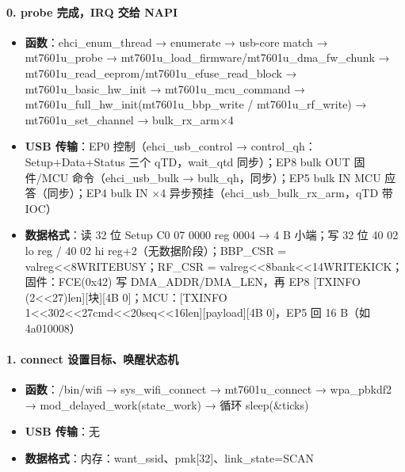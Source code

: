 \paragraph*{0. probe 完成，IRQ 交给 NAPI}
\begin{itemize}[leftmargin=2em,itemsep=1pt]
\item \textbf{函数}：ehci\_enum\_thread → enumerate → usb-core match → mt7601u\_probe → mt7601u\_load\_firmware/mt7601u\_dma\_fw\_chunk → mt7601u\_read\_eeprom/mt7601u\_efuse\_read\_block → mt7601u\_basic\_hw\_init → mt7601u\_mcu\_command → mt7601u\_full\_hw\_init(mt7601u\_bbp\_write / mt7601u\_rf\_write) → mt7601u\_set\_channel → bulk\_rx\_arm×4
\item \textbf{USB 传输}：EP0 控制（ehci\_usb\_control → control\_qh：Setup+Data+Status 三个 qTD，wait\_qtd 同步）；EP8 bulk OUT 固件/MCU 命令（ehci\_usb\_bulk → bulk\_qh，同步）；EP5 bulk IN MCU 应答（同步）；EP4 bulk IN ×4 异步预挂（ehci\_usb\_bulk\_rx\_arm，qTD 带 IOC）
\item \textbf{数据格式}：读 32 位 Setup C0 07 0000 reg 0004 → 4 B 小端；写 32 位 40 02 lo reg / 40 02 hi reg+2（无数据阶段）；BBP\_CSR = val\textbar{}reg\textless{}\textless{}8\textbar{}WRITE\textbar{}BUSY；RF\_CSR = val\textbar{}reg\textless{}\textless{}8\textbar{}bank\textless{}\textless{}14\textbar{}WRITE\textbar{}KICK；固件：FCE(0x42) 写 DMA\_ADDR/DMA\_LEN，再 EP8 [TXINFO (2\textless{}\textless{}27)\textbar{}len][块][4B 0]；MCU：[TXINFO 1\textless{}\textless{}30\textbar{}2\textless{}\textless{}27\textbar{}cmd\textless{}\textless{}20\textbar{}seq\textless{}\textless{}16\textbar{}len][payload][4B 0]，EP5 回 16 B（如 4a010008）
\end{itemize}

\paragraph*{1. connect 设置目标、唤醒状态机}
\begin{itemize}[leftmargin=2em,itemsep=1pt]
\item \textbf{函数}：/bin/wifi → sys\_wifi\_connect → mt7601u\_connect → wpa\_pbkdf2 → mod\_delayed\_work(state\_work) → 循环 sleep(\&ticks)
\item \textbf{USB 传输}：无
\item \textbf{数据格式}：内存：want\_ssid、pmk[32]、link\_state=SCAN
\end{itemize}

